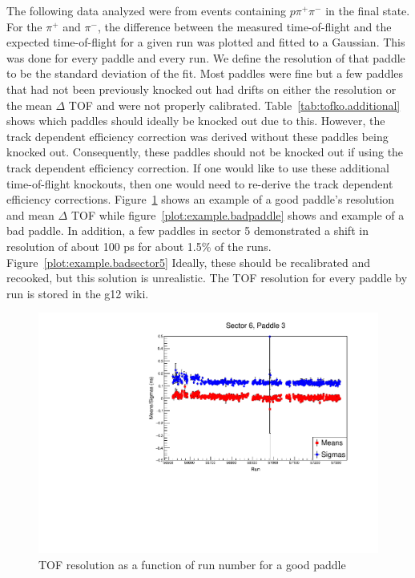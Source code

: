 \documentclass[ 12 pt]{article}
\begin{document}
\begin{itemize}
The following data analyzed were from events containing $p \pi^{+} \pi^{-}$ in the final state. For the $\pi^{+}$ and $\pi^{-}$, the difference between the measured time-of-flight and the expected time-of-flight for a given run was plotted and fitted to a Gaussian. This was done for every paddle and every run. We define the resolution of that paddle to be the standard deviation of the fit. Most paddles were fine but a few paddles that had not been previously knocked out had drifts on either the resolution or the mean $\Delta$ TOF and were not properly calibrated. Table~\ref{tab:tofko.additional} shows which paddles should ideally be knocked out due to this. However, the track dependent efficiency correction was derived without these paddles being knocked out. Consequently, these paddles should not be knocked out if using the track dependent efficiency correction. If one would like to use these additional time-of-flight knockouts, then one would need to re-derive the track dependent efficiency corrections. Figure~\ref{plot:example.goodpaddle} shows an example of a good paddle's resolution and mean $\Delta$ TOF while figure~\ref{plot:example.badpaddle} shows and example of a bad paddle. In addition, a few paddles in sector 5 demonstrated a shift in resolution of about 100 ps for about 1.5\% of the runs. Figure~\ref{plot:example.badsector5} Ideally, these should be recalibrated and recooked, but this solution is unrealistic. The TOF resolution for every paddle by run is stored in the g12 wiki.




\begin{figure}\begin{center}
      \includegraphics[width=0.6\columnwidth]{figures/calib/tof/goodexample.pdf}
   \caption{\label{plot:example.goodpaddle}TOF resolution as a function of run number for a good paddle}
\end{center}\end{figure}


\end{itemize}
\end{document}
